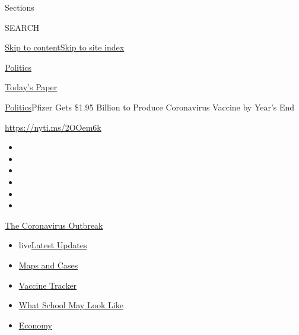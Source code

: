 Sections

SEARCH

\protect\hyperlink{site-content}{Skip to
content}\protect\hyperlink{site-index}{Skip to site index}

\href{https://www.nytimes.com/section/politics}{Politics}

\href{https://myaccount.nytimes.com/auth/login?response_type=cookie\&client_id=vi}{}

\href{https://www.nytimes.com/section/todayspaper}{Today's Paper}

\href{/section/politics}{Politics}\textbar{}Pfizer Gets \$1.95 Billion
to Produce Coronavirus Vaccine by Year's End

\url{https://nyti.ms/2OOem6k}

\begin{itemize}
\item
\item
\item
\item
\item
\item
\end{itemize}

\href{https://www.nytimes.com/news-event/coronavirus?action=click\&pgtype=Article\&state=default\&region=TOP_BANNER\&context=storylines_menu}{The
Coronavirus Outbreak}

\begin{itemize}
\tightlist
\item
  live\href{https://www.nytimes.com/2020/08/02/world/coronavirus-updates.html?action=click\&pgtype=Article\&state=default\&region=TOP_BANNER\&context=storylines_menu}{Latest
  Updates}
\item
  \href{https://www.nytimes.com/interactive/2020/us/coronavirus-us-cases.html?action=click\&pgtype=Article\&state=default\&region=TOP_BANNER\&context=storylines_menu}{Maps
  and Cases}
\item
  \href{https://www.nytimes.com/interactive/2020/science/coronavirus-vaccine-tracker.html?action=click\&pgtype=Article\&state=default\&region=TOP_BANNER\&context=storylines_menu}{Vaccine
  Tracker}
\item
  \href{https://www.nytimes.com/interactive/2020/07/29/us/schools-reopening-coronavirus.html?action=click\&pgtype=Article\&state=default\&region=TOP_BANNER\&context=storylines_menu}{What
  School May Look Like}
\item
  \href{https://www.nytimes.com/live/2020/07/31/business/stock-market-today-coronavirus?action=click\&pgtype=Article\&state=default\&region=TOP_BANNER\&context=storylines_menu}{Economy}
\end{itemize}

